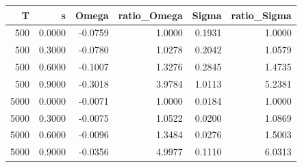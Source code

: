 \begin{tabular}{rrrrrr}
\toprule
T & s & Omega & ratio_Omega & Sigma & ratio_Sigma \\
\midrule
500 & 0.0000 & -0.0759 & 1.0000 & 0.1931 & 1.0000 \\
500 & 0.3000 & -0.0780 & 1.0278 & 0.2042 & 1.0579 \\
500 & 0.6000 & -0.1007 & 1.3276 & 0.2845 & 1.4735 \\
500 & 0.9000 & -0.3018 & 3.9784 & 1.0113 & 5.2381 \\
5000 & 0.0000 & -0.0071 & 1.0000 & 0.0184 & 1.0000 \\
5000 & 0.3000 & -0.0075 & 1.0522 & 0.0200 & 1.0869 \\
5000 & 0.6000 & -0.0096 & 1.3484 & 0.0276 & 1.5003 \\
5000 & 0.9000 & -0.0356 & 4.9977 & 0.1110 & 6.0313 \\
\bottomrule
\end{tabular}
